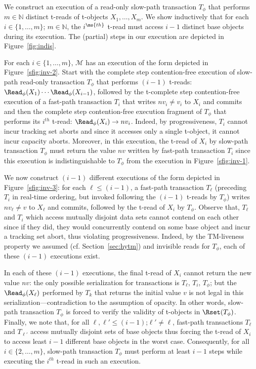 \begin{proofsketch}
We construct an execution of a read-only slow-path transaction $T_{\phi}$ that performs $m \in \mathbb{N}$
distinct t-reads of t-objects $X_1,\ldots , X_m$. We show inductively that for each 
$i\in \{1,\ldots , m\}$; $m \in \mathbb{N}$, the $i^{\ms{th}}$ t-read must access $i-1$ distinct base objects
during its execution. The (partial) steps in our execution are depicted in Figure~\ref{fig:indis}.

For each $i\in \{1,\ldots , m\}$, $\mathcal{M}$ has an execution of the form depicted in Figure~\ref{sfig:inv-2}.
Start with the complete step contention-free execution of slow-path read-only transaction $T_{\phi}$ that performs
$(i-1)$ t-reads: $\Read_{\phi}(X_1)\cdots \Read_{\phi}(X_{i-1})$, followed by the t-complete step contention-free execution of a fast-path transaction $T_{i}$
that writes $nv_i\neq v_i$ to $X_i$ and commits and then the complete step contention-free execution fragment of $T_{\phi}$ that performs its $i^{th}$ t-read:
$\Read_{\phi}(X_i) \rightarrow nv_i$. Indeed, by progressiveness, $T_i$ cannot incur tracking set aborts and since it accesses only a single t-object, it cannot incur capacity aborts.
Moreover, in this execution, the t-read of $X_i$ by slow-path transaction $T_{\phi}$ must return the value $nv$ written by fast-path transaction $T_i$ since this execution is indistinguishable
to $T_{\phi}$ from the execution in Figure~\ref{sfig:inv-1}. 

We now construct $(i-1)$ different executions of the form depicted in Figure~\ref{sfig:inv-3}: for each $\ell \leq (i-1)$, 
a fast-path transaction $T_{\ell}$ (preceding $T_i$ in real-time ordering, but invoked following the $(i-1)$ t-reads by $T_{\phi}$) writes $nv_{\ell}\neq v$ to $X_{\ell}$ and commits, followed by
the t-read of $X_i$ by $T_{\phi}$. Observe that, $T_{\ell}$ and $T_i$ which access mutually disjoint data sets cannot contend on each other since if they did, they would concurrently contend
on some base object and incur a tracking set abort, thus violating progressiveness.
Indeed, by the TM-liveness property we assumed (cf. Section~\ref{sec:hytm}) and invisible reads for $T_{\phi}$, each of these $(i-1)$ executions exist. 

In each of these $(i-1)$ executions, the final t-read of $X_i$ cannot return the new value $nv$:
the only possible serialization for transactions is $T_{\ell}$, $T_i$, $T_{\phi}$; but the $\Read_{\phi}(X_{\ell})$
performed by $T_k$ that returns the initial value $v$ is not legal in this serialization---contradiction to the assumption of opacity.
In other words, slow-path transaction $T_{\phi}$ is forced to verify the validity of t-objects in $\Rset(T_{\phi})$.
Finally, we note that, for all $\ell, \ell' \leq (i-1)$;$\ell' \neq \ell$, 
fast-path transactions $T_{\ell}$ and $T_{\ell'}$ access mutually disjoint sets of base objects thus forcing the t-read of $X_i$ to access least $i-1$ different base objects
in the worst case.
Consequently, for all $i \in \{2,\ldots, m\}$, slow-path transaction $T_{\phi}$ must perform at least $i-1$ steps 
while executing the $i^{th}$ t-read in such an execution.
\end{proofsketch}

